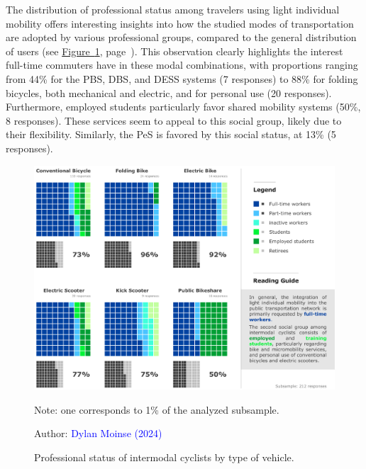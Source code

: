 \begin{refsegment}

The distribution of professional status among travelers using light individual mobility offers interesting insights into how the studied modes of transportation are adopted by various professional groups, compared to the general distribution of users (see \hyperref[fig-chap4:statut-social]{Figure~\ref{fig-chap4:statut-social}}, page~\pageref{fig-chap4:statut-social}). This observation clearly highlights the interest full-time commuters have in these modal combinations, with proportions ranging from 44\% for the \acrshort{PBS}, \acrshort{DBS}, and \acrshort{DESS} systems (7 responses) to 88\% for folding bicycles, both mechanical and electric, and for personal use (20 responses). Furthermore, employed students particularly favor shared mobility systems (50\%, 8 responses). These services seem to appeal to this social group, likely due to their flexibility. Similarly, the \acrshort{PeS} is favored by this social status, at 13\% (5 responses).%

    \begin{figure}[h!]\vspace*{4pt}
        \caption{Professional status of intermodal cyclists by type of vehicle.}
        \label{fig-chap4:statut-social}
        \centerline{\includegraphics[width=1\columnwidth]{src/Figures/Chap-4/EN_Statut.pdf}}
        \vspace{5pt}
        \begin{flushleft}\scriptsize{
        Note: one  corresponds to 1\% of the analyzed subsample.
        }\end{flushleft}
        \begin{flushright}\scriptsize{
        Author: \textcolor{blue}{Dylan Moinse (2024)}
        }\end{flushright}
    \end{figure}


\end{refsegment}
